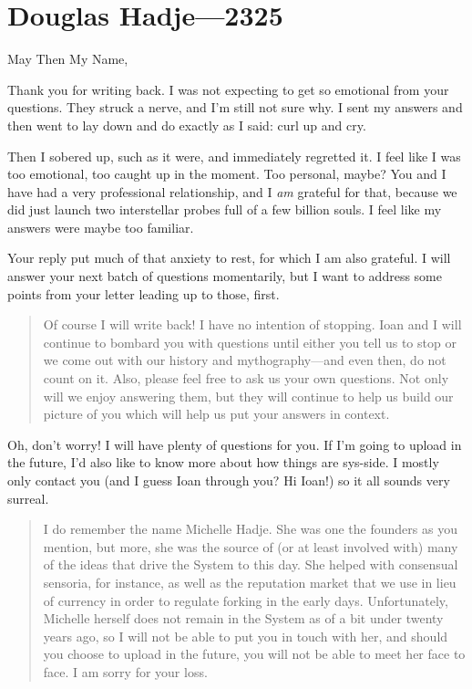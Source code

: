\hypertarget{douglas-hadje-2325}{%
\chapter{Douglas Hadje---2325}\label{douglas-hadje-2325}}

May Then My Name,

Thank you for writing back. I was not expecting to get so emotional from your questions. They struck a nerve, and I'm still not sure why. I sent my answers and then went to lay down and do exactly as I said: curl up and cry.

Then I sobered up, such as it were, and immediately regretted it. I feel like I was too emotional, too caught up in the moment. Too personal, maybe? You and I have had a very professional relationship, and I \emph{am} grateful for that, because we did just launch two interstellar probes full of a few billion souls. I feel like my answers were maybe too familiar.

Your reply put much of that anxiety to rest, for which I am also grateful. I will answer your next batch of questions momentarily, but I want to address some points from your letter leading up to those, first.

\begin{quote}
Of course I will write back! I have no intention of stopping. Ioan and I will continue to bombard you with questions until either you tell us to stop or we come out with our history and mythography---and even then, do not count on it. Also, please feel free to ask us your own questions. Not only will we enjoy answering them, but they will continue to help us build our picture of you which will help us put your answers in context.
\end{quote}

\noindent Oh, don't worry! I will have plenty of questions for you. If I'm going to upload in the future, I'd also like to know more about how things are sys-side. I mostly only contact you (and I guess Ioan through you? Hi Ioan!) so it all sounds very surreal.

\begin{quote}
I do remember the name Michelle Hadje. She was one the founders as you mention, but more, she was the source of (or at least involved with) many of the ideas that drive the System to this day. She helped with consensual sensoria, for instance, as well as the reputation market that we use in lieu of currency in order to regulate forking in the early days. Unfortunately, Michelle herself does not remain in the System as of a bit under twenty years ago, so I will not be able to put you in touch with her, and should you choose to upload in the future, you will not be able to meet her face to face. I am sorry for your loss.
\end{quote}

